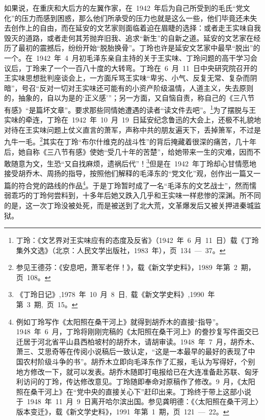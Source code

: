 如果说，在重庆和大后方的左翼作家，在~1942~年后为自己所受到的毛氏“党文化”的压力而感到困惑，那么他们所承受的压力也就是这么一些，他们毕竟还未失去创作上的自由，而在延安的文艺家则面临着迫在眉睫的选择：或者走王实味自我毁灭的道路，或者走何其芳抛弃旧我、追求“新生”的自新之道。延安的文艺家在经历了最初的震撼后，纷纷开始“脱胎换骨”。丁玲也许是延安文艺家中最早“脱出”的一个。在~1942~年~4~月初毛泽东亲自主持的关于王实味、丁玲问题的高干学习会议后，丁玲来了一个一百八十度的大转弯。丁玲在~6~月~11~日中央研究院召开的王实味思想批判座谈会上，一方面斥骂王实味“卑劣、小气、反复无常、复杂而阴暗”，号召“反对一切对王实味还可能有的小资产阶级温情，人道主义，失去原则的，抽象的，自以为是的‘正义感’”；另一方面，又自恼自责，称自己的《三八节有感》“是篇坏文章”。要求那些同情她遭遇的读者“读文件去吧”。\footnote{丁玲：《文艺界对王实味应有的态度及反省》（1942~年~6~月~11~日）载《丁玲集外文选》（北京：人民文学出版社，1983~年），页~134~—~37。}为了摆脱与王实味的牵连，丁玲在~1942~年~10~月~19~日延安纪念鲁迅的大会上，还极不礼貌地对待在王实味问题上仗义直言的萧军，声称中共的朋友遍天下，丢掉箫军，不过是九牛一毛。\footnote{参见王德芬：《安息吧，萧军老伴！》，载《新文学史料》，1989~年第~2~期，页~108。}其实在丁玲“布尔什维克的战斗性”的背后掩藏着很深的痛苦，几十年后，她自称《三八节有感》使她“受几十年的苦楚”，给她带来一生的灾难，因而不敢随意为文，生恐“又自找麻烦，遗祸后代”！\footnote{《丁玲日记》,1978~年~10~月~8~日,~载《新文学史料》,1990~年第~3~期,~页~15。}但是在~1942~年丁玲却心甘情愿地接受胡乔木、周扬的指导，按照他们解释的毛泽东的“党文化”观，创作出一篇又一篇的符合党的路线的作品\footnote{例如丁玲写作《太阳照在桑干河上》就得到胡乔木的直接“指导”。1948~年~6~月，丁玲将刚刚完稿的《太阳照在桑干河上》的誊抄复写件面交已迁居于河北省平山县西柏坡村的胡乔木，请胡审读。1948~年~7~月，胡乔木、萧三、艾思奇等在传阅小说稿后一致认定，“这是一本最早的最好的表现了中国农村阶级斗争的书”。胡乔木立即向毛泽东作了汇报，毛认为写得好，个别地方修改一下，就可以发表。胡乔木随即打电报给已在大连准备赴苏联、匈牙利访问的丁玲，传达修改意见。丁玲随即奉命对原稿作了修改。9~月，《太阳照在桑干河上》在“党中央的直接关心下”赶印出来。丁玲终于带上这部小说于~1948~年~11~月~9~日离开哈尔滨出国。参见龚明德：《〈太阳照在桑干河上〉版本变迁》，载《新文学史料》，1991~年第~1~期，页~121~—~22。}。于是丁玲暂时成了一名“毛泽东的文艺战士”，然而懦弱乖巧的丁玲何尝料到，十多年后她又跌入几乎和王实味一样悲惨的深渊。所不同的是，这一次丁玲没被处死，而是被送到了北大荒，文革爆发后又被关押进秦城监狱。